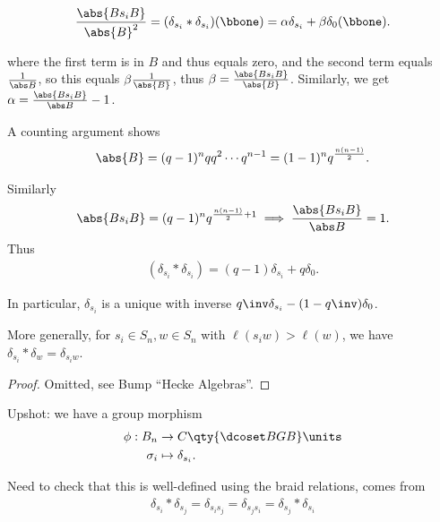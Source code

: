 \begin{align*} 
{\abs{B s_i B} \over \abs{B}^2} 
= (\delta_{s_i} \ast \delta_{s_i}) (\bbone) 
= \alpha \delta_{s_i} + \beta \delta_0(\bbone)
.\end{align*}

where the first term is in \(B\) and thus equals zero, and the second
term equals \(1\over \abs B\), so this equals \(\beta{1\over \abs{B}}\),
thus \(\beta = {\abs{Bs_i B} \over \abs{B} }\). Similarly, we get
\(\alpha = {\abs{Bs_i B} \over \abs B} - 1\).

A counting argument shows
\begin{align*}
\abs{B} = (q-1)^n q q^2 \cdots q^{n-1} = (1-1)^n q^{n(n-1) \over 2}
.\end{align*}

Similarly
\begin{align*}
\abs{Bs_i B} = (q-1)^n q^{{n(n-1) \over 2} + 1}
\implies 
{\abs{Bs_i B} \over \abs B} = 1
.\end{align*} Thus
\begin{align*}
(\delta_{s_i} \ast \delta_{s_i}) 
= (q-1) \delta_{s_i} + q\delta_0
.\end{align*}

In particular, \(\delta_{s_i}\) is a unique with inverse
\(q\inv \delta_{s_i} - (1-q\inv) \delta_0\).

\begin{claim}

More generally, for \(s_i \in S_n, w\in S_n\) with
\(\ell(s_i w) > \ell(w)\), we have
\(\delta_{s_i} \ast \delta_w = \delta_{s_i w}\).

\end{claim}

\begin{proof}

Omitted, see Bump ``Hecke Algebras''.

\end{proof}

Upshot: we have a group morphism
\begin{align*}
\phi: B_n &\to C\qty{\dcoset B G B}\units \\
\sigma_i &\mapsto \delta_{s_i}
.\end{align*}

Need to check that this is well-defined using the braid relations, comes
from
\begin{align*}
\delta_{s_i} \ast \delta_{s_j} = \delta_{s_i s_j} = \delta_{s_j s_i} = \delta_{s_j} \ast \delta_{s_i}
\end{align*}


